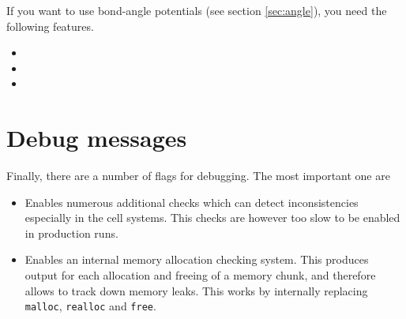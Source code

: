 If you want to use bond-angle potentials (see section
\vref{sec:angle}), you need the following features.
\begin{itemize}
\item {}
\item {}
\item {}
\end{itemize}

\section{Debug messages}

Finally, there are a number of flags for debugging. The most important
one are
\begin{itemize}
\item {} Enables numerous additional checks
  which can detect inconsistencies especially in the cell systems.
  This checks are however too slow to be enabled in production runs.
\item {} Enables an internal memory allocation
  checking system. This produces output for each allocation and
  freeing of a memory chunk, and therefore allows to track down memory
  leaks. This works by internally replacing \texttt{malloc},
  \texttt{realloc} and \texttt{free}.
\end{itemize}


